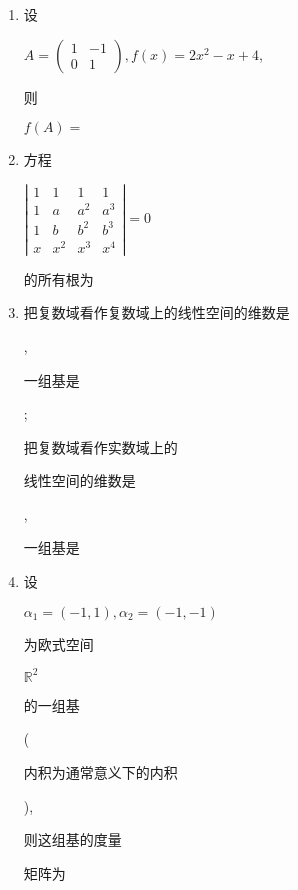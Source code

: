 \documentclass[10pt]{article}
\begin{document}
\begin{enumerate}
  \item \begin{CJK}{UTF8}{mj}设\end{CJK} $A=\left(\begin{array}{cc}1 & -1 \\ 0 & 1\end{array}\right), f(x)=2 x^{2}-x+4$, \begin{CJK}{UTF8}{mj}则\end{CJK} $f(A)=$

  \item \begin{CJK}{UTF8}{mj}方程\end{CJK} $\left|\begin{array}{cccc}1 & 1 & 1 & 1 \\ 1 & a & a^{2} & a^{3} \\ 1 & b & b^{2} & b^{3} \\ x & x^{2} & x^{3} & x^{4}\end{array}\right|=0$ \begin{CJK}{UTF8}{mj}的所有根为\end{CJK}

  \item \begin{CJK}{UTF8}{mj}把复数域看作复数域上的线性空间的维数是\end{CJK} ,\begin{CJK}{UTF8}{mj}一组基是\end{CJK} ; \begin{CJK}{UTF8}{mj}把复数域看作实数域上的\end{CJK} \begin{CJK}{UTF8}{mj}线性空间的维数是\end{CJK} ,\begin{CJK}{UTF8}{mj}一组基是\end{CJK}

  \item \begin{CJK}{UTF8}{mj}设\end{CJK} $\alpha_{1}=(-1,1), \alpha_{2}=(-1,-1)$ \begin{CJK}{UTF8}{mj}为欧式空间\end{CJK} $\mathbb{R}^{2}$ \begin{CJK}{UTF8}{mj}的一组基\end{CJK}(\begin{CJK}{UTF8}{mj}内积为通常意义下的内积\end{CJK}), \begin{CJK}{UTF8}{mj}则这组基的度量\end{CJK} \begin{CJK}{UTF8}{mj}矩阵为\end{CJK}


\end{enumerate}
\end{document}
